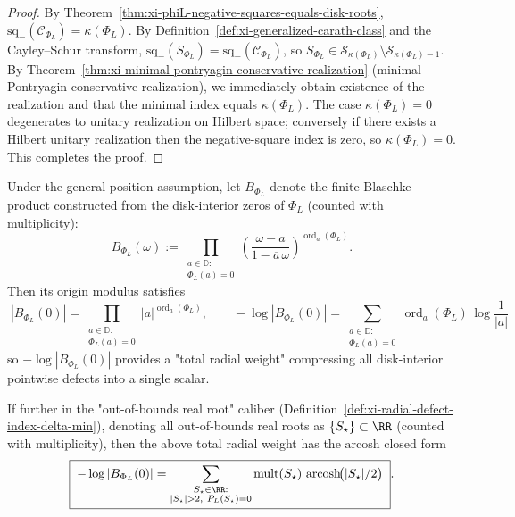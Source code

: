 \begin{proof}
By Theorem~\ref{thm:xi-phiL-negative-squares-equals-disk-roots}, \(\mathrm{sq}_-(\mathscr{C}_{\Phi_L})=\kappa(\Phi_L)\).
By Definition~\ref{def:xi-generalized-carath-class} and the Cayley--Schur transform, \(\mathrm{sq}_-(S_{\Phi_L})=\mathrm{sq}_-(\mathscr{C}_{\Phi_L})\), so \(S_{\Phi_L}\in\mathcal{S}_{\kappa(\Phi_L)}\setminus\mathcal{S}_{\kappa(\Phi_L)-1}\).
By Theorem~\ref{thm:xi-minimal-pontryagin-conservative-realization} (minimal Pontryagin conservative realization), we immediately obtain existence of the realization and that the minimal index equals \(\kappa(\Phi_L)\).
The case \(\kappa(\Phi_L)=0\) degenerates to unitary realization on Hilbert space; conversely if there exists a Hilbert unitary realization then the negative-square index is zero, so \(\kappa(\Phi_L)=0\). This completes the proof.
\end{proof}

\begin{proposition}\label{prop:xi-phiL-defect-weight-blaschke-origin}
Under the general-position assumption, let \(B_{\Phi_L}\) denote the finite Blaschke product constructed from the disk-interior zeros of \(\Phi_L\) (counted with multiplicity):
\[
B_{\Phi_L}(\omega):=\prod_{\substack{a\in\mathbb{D}:\\ \Phi_L(a)=0}}
\left(\frac{\omega-a}{1-\overline a\,\omega}\right)^{\operatorname{ord}_a(\Phi_L)}.
\]
Then its origin modulus satisfies
\[
\boxed{\;
|B_{\Phi_L}(0)|
=\prod_{\substack{a\in\mathbb{D}:\\ \Phi_L(a)=0}}|a|^{\operatorname{ord}_a(\Phi_L)},\qquad
-\log|B_{\Phi_L}(0)|
=\sum_{\substack{a\in\mathbb{D}:\\ \Phi_L(a)=0}}\operatorname{ord}_a(\Phi_L)\,\log\frac{1}{|a|}\;}
\]
so \(-\log|B_{\Phi_L}(0)|\) provides a "total radial weight" compressing all disk-interior pointwise defects into a single scalar.
\par
If further in the "out-of-bounds real root" caliber (Definition~\ref{def:xi-radial-defect-index-delta-min}), denoting all out-of-bounds real roots as \(\{S_\star\}\subset\RR\) (counted with multiplicity), then the above total radial weight has the \(\mathrm{arcosh}\) closed form
\[
\boxed{\;
-\log|B_{\Phi_L}(0)|
=\sum_{\substack{S_\star\in\RR:\\ |S_\star|>2,\ P_L(S_\star)=0}}
\mathrm{mult}(S_\star)\,\operatorname{arcosh}\!\bigl(|S_\star|/2\bigr)\; }.
\]
\end{proposition}

